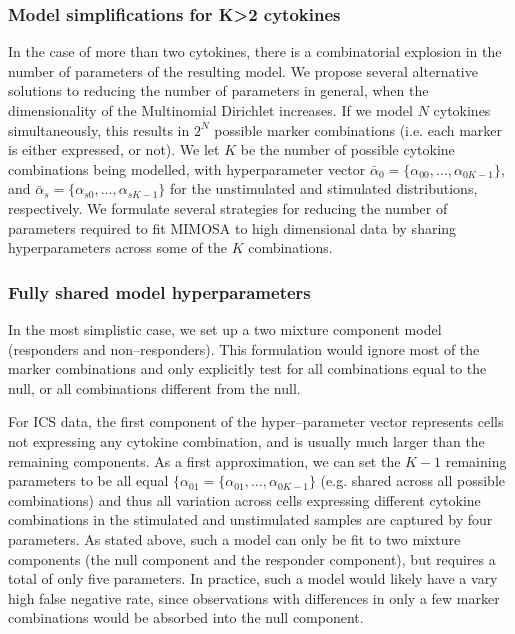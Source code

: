 \documentclass[11pt]{article}
\begin{document}
\subsubsection*{Model simplifications for K>2 cytokines}
In the case of more than two cytokines, there is a combinatorial explosion in the number of parameters of the resulting model. We propose several alternative solutions to reducing the number of parameters in general, when the dimensionality of the Multinomial Dirichlet increases. If we model $N$ cytokines simultaneously, this results in $2^N$ possible marker combinations (i.e. each marker is either expressed, or not). We let $K$ be the number of possible cytokine combinations being modelled, with hyperparameter vector $\bar{\alpha}_0=\{\alpha_{00},\ldots,\alpha_{0K-1}\}$, and $\bar{\alpha}_s=\{\alpha_{s0},\ldots,\alpha_{sK-1}\}$ for the unstimulated and stimulated distributions, respectively. We formulate several strategies for reducing the number of parameters required to fit MIMOSA to high dimensional data by sharing hyperparameters across some of the $K$ combinations.

\subsubsection*{Fully shared model hyperparameters}
In the most simplistic case, we set up a two mixture component model (responders and non--responders). This formulation would ignore most of the marker combinations and only explicitly test for all combinations equal to the null, or all combinations different from the null. 

For ICS data, the first component of the hyper--parameter vector represents cells not expressing any cytokine combination, and is usually much larger than the remaining components. As a first approximation, we can set the $K-1$ remaining parameters to be all equal $\{\alpha_{01}=\{\alpha_{01},\ldots,\alpha_{0K-1}\}$ (e.g. shared across all possible combinations) and thus all variation across cells expressing different cytokine combinations in the stimulated and unstimulated samples are captured by four parameters. As stated above, such a model can only be fit to two mixture components (the null component and the responder component), but requires a total of only five parameters. In practice, such a model would likely have a vary high false negative rate, since observations with differences in only a few marker combinations would be absorbed into the null component.
\end{document}
